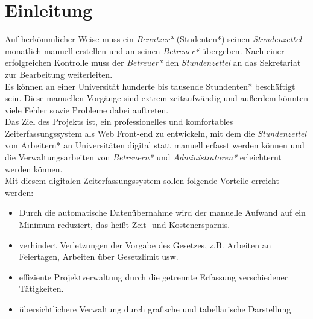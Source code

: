 \section{Einleitung}

Auf herkömmlicher Weise muss ein \emph{Benutzer*} (Studenten*) seinen \emph{Stundenzettel} monatlich manuell erstellen und an seinen \emph{Betreuer*} übergeben. Nach einer erfolgreichen Kontrolle muss der \emph{Betreuer*} den \emph{Stundenzettel} an das Sekretariat zur Bearbeitung weiterleiten. \\

Es können an einer Universität hunderte bis tausende Stundenten* beschäftigt sein. Diese manuellen Vorgänge sind extrem zeitaufwändig und außerdem könnten viele Fehler sowie Probleme dabei auftreten.\\

Das Ziel des Projekts ist, ein professionelles und komfortables Zeiterfassungssystem als Web Front-end zu entwickeln, mit dem die \emph{Stundenzettel} von Arbeitern* an Universitäten digital statt manuell erfasst werden können und die Verwaltungsarbeiten von \emph{Betreuern*} und \emph{Administratoren*} erleichternt werden können.\\

Mit diesem digitalen Zeiterfassungssystem sollen folgende Vorteile erreicht werden:\\

\begin{itemize}
	\item Durch die automatische Datenübernahme wird der manuelle Aufwand auf ein Minimum reduziert, das heißt Zeit- und Kostenersparnis.
	\item verhindert Verletzungen der Vorgabe des Gesetzes, z.B. Arbeiten an Feiertagen, Arbeiten über Gesetzlimit usw.
	\item effiziente Projektverwaltung durch die getrennte Erfassung verschiedener Tätigkeiten.
	\item übersichtlichere Verwaltung durch grafische und tabellarische Darstellung
\end{itemize}
